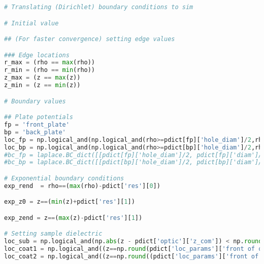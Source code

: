 \begin{lstlisting}[frame=single, language=Python]
# Translating (Dirichlet) boundary conditions to sim 

# Initial value 

## (For faster convergence) setting edge values

### Edge locations
r_max = (rho == max(rho))
r_min = (rho == min(rho))
z_max = (z == max(z))
z_min = (z == min(z))

# Boundary values 

## Plate potentials
fp = 'front_plate'
bp = 'back_plate'
loc_fp = np.logical_and(np.logical_and(rho>=pdict[fp]['hole_diam']/2,rho<=pdict[fp]['diam']/2),z == pdict[fp]['zpos'])
loc_bp = np.logical_and(np.logical_and(rho>=pdict[bp]['hole_diam']/2,rho<=pdict[bp]['diam']/2),z == pdict[bp]['zpos'])
#bc_fp = laplace.BC_dict([[pdict[fp]['hole_diam']/2, pdict[fp]['diam']/2], pdict[fp]['zpos']],pdict[fp]['voltage'],fp, LAMBD)
#bc_bp = laplace.BC_dict([[pdict[bp]['hole_diam']/2, pdict[bp]['diam']/2], pdict[bp]['zpos']],pdict[fp]['voltage'],bp, LAMBD)

# Exponential boundary conditions
exp_rend  = rho==(max(rho)-pdict['res'][0])

exp_z0 = z==(min(z)+pdict['res'][1])

exp_zend = z==(max(z)-pdict['res'][1])

# Setting sample dielectric
loc_sub = np.logical_and(np.abs(z - pdict['optic']['z_com']) < np.round((pdict['optic']['thickness']/2),pdict['res_exp'][1]), (rho<np.round((pdict['optic']['diam']/2),pdict['res_exp'][0])))
loc_coat1 = np.logical_and((z==np.round(pdict['loc_params']['front of optic']['z'],pdict['res_exp'][1])), (rho < np.round((pdict['optic']['diam']/2), pdict['res_exp'][0])))
loc_coat2 = np.logical_and((z==np.round((pdict['loc_params']['front of optic']['z']-pdict['res'][1]),pdict['res_exp'][1])), (rho < (np.round(pdict['optic']['diam']/2, pdict['res_exp'][0]))))
\end{lstlisting}

